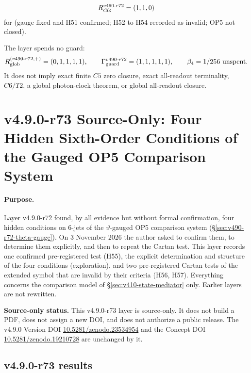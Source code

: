 \[
R_{\rm chk}^{v490\text{-}r72}=(1,1,0)
\]
for (gauge fixed and H51 confirmed; H52 to H54 recorded as invalid; OP5 not closed).

The layer spends no guard:
\[
R_{\rm glob}^{(v490\text{-}r72,+)}=(0,1,1,1,1),
\qquad
\Gamma_{\rm guard}^{v490\text{-}r72}=(1,1,1,1,1),
\qquad
\beta_4=1/256\ \text{unspent}.
\]
It does not imply exact finite \(C5\) zero closure, exact all-readout terminality,
\(C6/T2\), a global photon-clock theorem, or global all-readout closure.

\clearpage
\section*{v4.9.0-r73 Source-Only: Four Hidden Sixth-Order Conditions of the Gauged OP5 Comparison System}
\label{sec:v490-r73-hidden-conditions}

\paragraph{Purpose.}
Layer v4.9.0-r72 found, by all evidence but without formal confirmation, four hidden conditions on 6-jets of the
\(\vartheta\)-gauged OP5 comparison system (\S\ref{sec:v490-r72-theta-gauge}).  On 3 November 2026 the author asked to confirm
them, to determine them explicitly, and then to repeat the Cartan test.  This layer records one confirmed pre-registered test
(H55), the explicit determination and structure of the four conditions (exploration), and two pre-registered Cartan tests of
the extended symbol that are invalid by their criteria (H56, H57).  Everything concerns the comparison model of
\S\ref{sec:v410-state-mediator} only.  Earlier layers are not rewritten.

\noindent\textbf{Source-only status.}
This v4.9.0-r73 layer is source-only.  It does not build a PDF, does not assign a new DOI,
and does not authorize a public release.  The v4.9.0 Version DOI
\href{https://doi.org/10.5281/zenodo.23534954}{10.5281/zenodo.23534954} and the Concept DOI
\href{https://doi.org/10.5281/zenodo.19210728}{10.5281/zenodo.19210728} are unchanged by it.

\subsection*{v4.9.0-r73 results}
\label{subsec:v490-r73-results}

